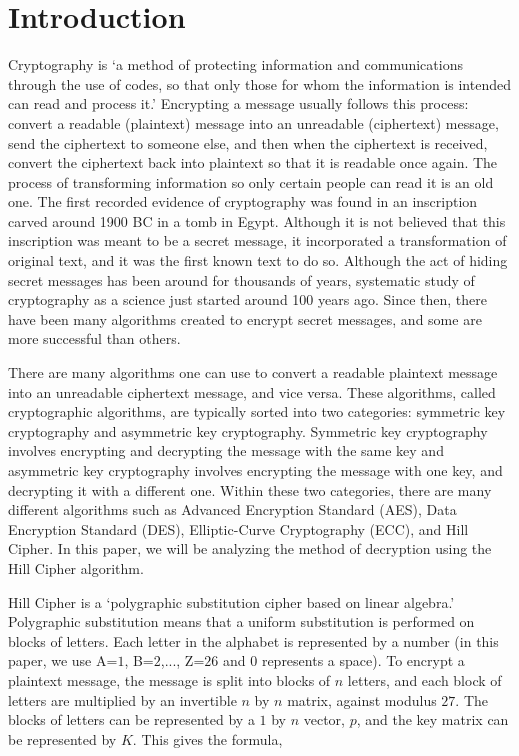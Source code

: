 \documentclass{article}
\begin{document}
\section{Introduction}
Cryptography is `a method of protecting information and communications through the use of codes, so that only those for whom the information is intended can read and process it.' \cite{kath} Encrypting a message usually follows this process: convert a readable (plaintext) message into an unreadable (ciphertext) message, send the ciphertext to someone else, and then when the ciphertext is received, convert the ciphertext back into plaintext so that it is readable once again. The process of transforming information so only certain people can read it is an old one. The first recorded evidence of cryptography was found in an inscription carved around 1900 BC in a tomb in Egypt. \cite{history} Although it is not believed that this inscription was meant to be a secret message, it incorporated a transformation of original text, and it was the first known text to do so. Although the act of hiding secret messages has been around for thousands of years, systematic study of cryptography as a science just started around 100 years ago. \cite{history} Since then, there have been many algorithms created to encrypt secret messages, and some are more successful than others.
\par There are many algorithms one can use to convert a readable plaintext message into an unreadable ciphertext message, and vice versa. These algorithms, called cryptographic algorithms, are typically sorted into two categories: symmetric key cryptography and asymmetric key cryptography. Symmetric key cryptography involves encrypting and decrypting the message with the same key and asymmetric key cryptography involves encrypting the message with one key, and decrypting it with a different one. Within these two categories, there are many different algorithms such as Advanced Encryption Standard (AES), Data Encryption Standard (DES), Elliptic-Curve Cryptography (ECC), and Hill Cipher. In this paper, we will be analyzing the method of decryption using the Hill Cipher algorithm.
\par Hill Cipher is a `polygraphic substitution cipher based on linear algebra.' \cite{geek} Polygraphic substitution means that a uniform substitution is performed on blocks of letters. Each letter in the alphabet is represented by a number (in this paper, we use A=$1$, B=$2$,..., Z=$26$ and $0$ represents a space). To encrypt a plaintext message, the message is split into blocks of $n$ letters, and each block of letters are multiplied by an invertible $n$ by $n$ matrix, against modulus $27$. The blocks of letters can be represented by a $1$ by $n$ vector, $p$, and the key matrix can be represented by $K$. This gives the formula,
\end{document}
